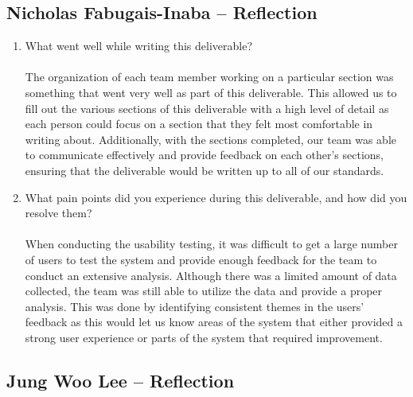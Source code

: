 \documentclass[12pt, titlepage]{article}
\begin{document}
\begin{enumerate}
\end{enumerate}

\subsection*{Nicholas Fabugais-Inaba -- Reflection}

\begin{enumerate}
  \item What went well while writing this deliverable?\\\\
  The organization of each team member working on a particular section was something that went
  very well as part of this deliverable. This allowed us to fill out the various sections of this
  deliverable with a high level of detail as each person could focus on a section that they felt most
  comfortable in writing about. Additionally, with the sections completed, our team was able to communicate
  effectively and provide feedback on each other's sections, ensuring that the deliverable
  would be written up to all of our standards.
  \item What pain points did you experience during this deliverable, and how
  did you resolve them?\\\\
  When conducting the usability testing, it was difficult to get a large number of users to test the
  system and provide enough feedback for the team to conduct an extensive analysis. Although there
  was a limited amount of data collected, the team was still able to utilize the data and provide
  a proper analysis. This was done by identifying consistent themes in the users' feedback as this
  would let us know areas of the system that either provided a strong user experience or parts of
  the system that required improvement.
\end{enumerate}

\subsection*{Jung Woo Lee -- Reflection}
\end{document}
